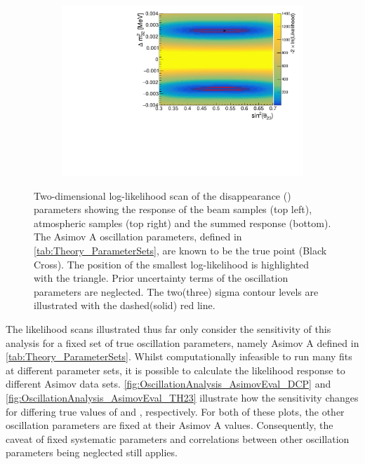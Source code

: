 \begin{figure}[h]
\begin{subfigure}[t]{1.0\textwidth}
    \includegraphics[width=\textwidth, trim={0mm 0mm 0mm 0mm}, clip,page=3]{Figures/OA/DisappearanceScans.pdf}
  \end{subfigure}
  \caption{Two-dimensional log-likelihood scan of the disappearance (\text{\textendash}) parameters showing the response of the beam samples (top left), atmospheric samples (top right) and the summed response (bottom). The Asimov A oscillation parameters, defined in \autoref{tab:Theory_ParameterSets}, are known to be the true point (Black Cross). The position of the smallest log-likelihood is highlighted with the triangle. Prior uncertainty terms of the oscillation parameters are neglected. The two(three) sigma contour levels are illustrated with the dashed(solid) red line.}
  \label{fig:OscillationAnalysis_2DLLHOscScans_Dis}
\end{figure}

\clearpage

The likelihood scans illustrated thus far only consider the sensitivity of this analysis for a fixed set of true oscillation parameters, namely Asimov A defined in \autoref{tab:Theory_ParameterSets}. Whilst computationally infeasible to run many fits at different parameter sets, it is possible to calculate the likelihood response to different Asimov data sets. \autoref{fig:OscillationAnalysis_AsimovEval_DCP} and \autoref{fig:OscillationAnalysis_AsimovEval_TH23} illustrate how the sensitivity changes for differing true values of  and , respectively. For both of these plots, the other oscillation parameters are fixed at their Asimov A values. Consequently, the caveat of fixed systematic parameters and correlations between other oscillation parameters being neglected still applies.

